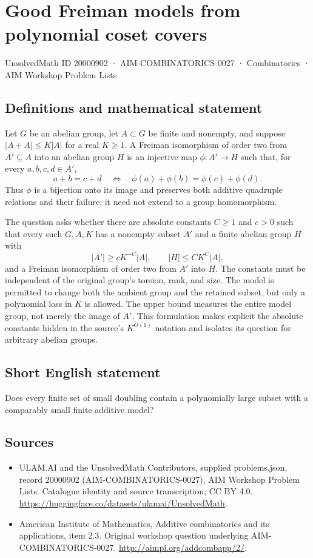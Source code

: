 \documentclass[11pt,a4paper]{article}
\begin{document}
\section*{Good Freiman models from polynomial coset covers}\label{20000902}
{\small UnsolvedMath ID 20000902 · AIM-COMBINATORICS-0027 · Combinatorics · AIM Workshop Problem Lists}
\subsection{Definitions and mathematical statement}
Let $G$ be an abelian group, let $A\subset G$ be finite and nonempty, and suppose $|A+A|\leq K|A|$ for a real $K\geq1$.
A Freiman isomorphism of order two from $A'\subseteq A$ into an abelian group $H$ is an injective map $\phi:A'\to H$ such that, for every $a,b,c,d\in A'$,
\[
 a+b=c+d\quad\Longleftrightarrow\quad
 \phi(a)+\phi(b)=\phi(c)+\phi(d).
\]
Thus $\phi$ is a bijection onto its image and preserves both additive quadruple relations and their failure; it need not extend to a group homomorphism.

The question asks whether there are absolute constants $C\geq1$ and $c>0$ such that every such $G,A,K$ has a nonempty subset $A'$ and a finite abelian group $H$ with
\[
 |A'|\geq cK^{-C}|A|,\qquad
 |H|\leq CK^C|A|,
\]
and a Freiman isomorphism of order two from $A'$ into $H$.
The constants must be independent of the original group's torsion, rank, and size.
The model is permitted to change both the ambient group and the retained subset, but only a polynomial loss in $K$ is allowed.
The upper bound measures the entire model group, not merely the image of $A'$.
This formulation makes explicit the absolute constants hidden in the source's $K^{O(1)}$ notation and isolates its question for arbitrary abelian groups.
\subsection{Short English statement}
Does every finite set of small doubling contain a polynomially large subset with a comparably small finite additive model?
\subsection{Sources}
\begin{itemize}
\item[S1] ULAM.AI and the UnsolvedMath Contributors, supplied problems.json, record 20000902 (AIM-COMBINATORICS-0027), AIM Workshop Problem Lists. Catalogue identity and source transcription; CC BY 4.0.
\url{https://huggingface.co/datasets/ulamai/UnsolvedMath}.
\item[S2] American Institute of Mathematics, Additive combinatorics and its applications, item 2.3. Original workshop question underlying AIM-COMBINATORICS-0027.
\url{http://aimpl.org/addcombapp/2/}.
\end{itemize}
\end{document}
